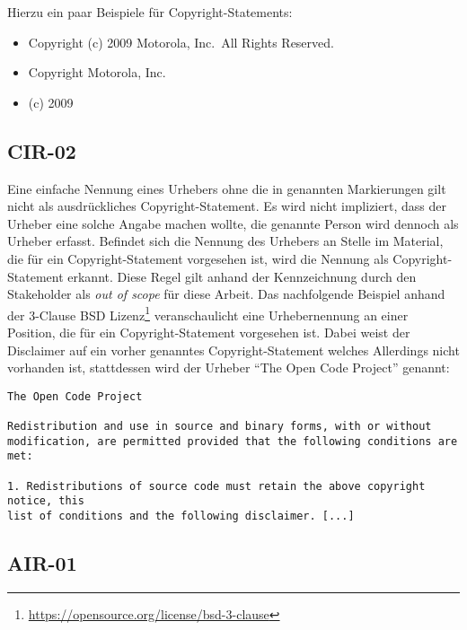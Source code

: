 Hierzu ein paar Beispiele für Copyright-Statements:
\begin{itemize}
    \item Copyright (c) 2009 Motorola, Inc.\ All Rights Reserved.
    \item Copyright Motorola, Inc.
    \item (c) 2009
\end{itemize}


\subsection{CIR-02}\label{subsec:cir-02}

Eine einfache Nennung eines Urhebers ohne die in  genannten Markierungen gilt nicht als ausdrückliches Copyright-Statement.
Es wird nicht impliziert, dass der Urheber eine solche Angabe machen wollte, die genannte Person wird dennoch als Urheber erfasst.
Befindet sich die Nennung des Urhebers an Stelle im Material, die für ein Copyright-Statement vorgesehen ist, wird die Nennung als Copyright-Statement erkannt.
Diese Regel gilt anhand der Kennzeichnung durch den Stakeholder als \textit{out of scope} für diese Arbeit.
Das nachfolgende Beispiel anhand der 3-Clause BSD Lizenz\footnote{\url{https://opensource.org/license/bsd-3-clause}} veranschaulicht eine Urhebernennung an einer Position, die für ein Copyright-Statement vorgesehen ist.
Dabei weist der Disclaimer auf ein vorher genanntes Copyright-Statement welches Allerdings nicht vorhanden ist, stattdessen wird der Urheber \enquote{The Open Code Project} genannt:

\begin{lstlisting}[keepspaces=true]
The Open Code Project

Redistribution and use in source and binary forms, with or without
modification, are permitted provided that the following conditions are met:

1. Redistributions of source code must retain the above copyright notice, this
list of conditions and the following disclaimer. [...]
\end{lstlisting}


\subsection{AIR-01}\label{subsec:air-01}

